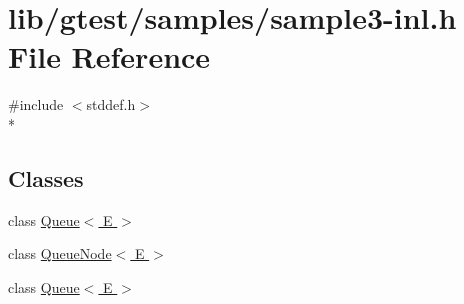 \hypertarget{sample3-inl_8h}{\section{lib/gtest/samples/sample3-\/inl.h File Reference}
\label{sample3-inl_8h}
}
{\ttfamily \#include $<$stddef.\-h$>$}\\*
\subsection*{Classes}
\begin{DoxyCompactItemize}
\item 
class \hyperlink{class_queue}{Queue$<$ E $>$}
\item 
class \hyperlink{class_queue_node}{Queue\-Node$<$ E $>$}
\item 
class \hyperlink{class_queue}{Queue$<$ E $>$}
\end{DoxyCompactItemize}
